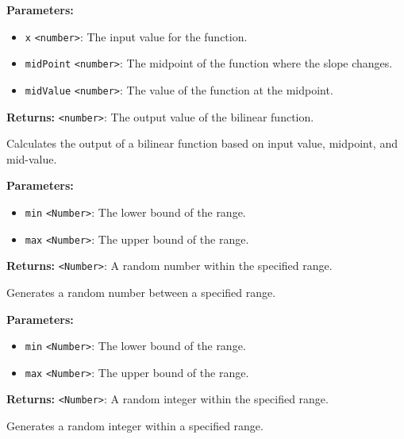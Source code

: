 \documentclass[12pt,a4paper]{article}
\begin{document}
\noindent \textbf{Parameters:}
\begin{itemize}
  \item \texttt{x} \texttt{<number>}: The input value for the function.
  \item \texttt{midPoint} \texttt{<number>}: The midpoint of the function where the slope changes.
  \item \texttt{midValue} \texttt{<number>}: The value of the function at the midpoint.
\end{itemize}

\noindent \textbf{Returns:} \texttt{<number>}: The output value of the bilinear function.

\noindent Calculates the output of a bilinear function based on input value, midpoint, and mid-value.

\vspace{5mm}
\noindent {}


\noindent \textbf{Parameters:}
\begin{itemize}
  \item \texttt{min} \texttt{<Number>}: The lower bound of the range.
  \item \texttt{max} \texttt{<Number>}: The upper bound of the range.
\end{itemize}

\noindent \textbf{Returns:} \texttt{<Number>}: A random number within the specified range.

\noindent Generates a random number between a specified range.

\vspace{5mm}
\noindent {}


\noindent \textbf{Parameters:}
\begin{itemize}
  \item \texttt{min} \texttt{<Number>}: The lower bound of the range.
  \item \texttt{max} \texttt{<Number>}: The upper bound of the range.
\end{itemize}

\noindent \textbf{Returns:} \texttt{<Number>}: A random integer within the specified range.

\noindent Generates a random integer within a specified range.
\end{document}

